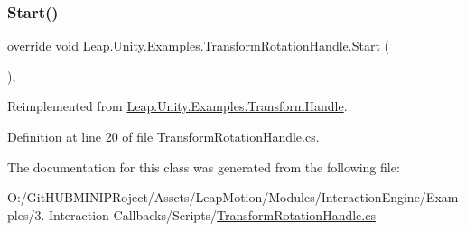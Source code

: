 \subsubsection{\texorpdfstring{Start()}{Start()}}
{\footnotesize\ttfamily override void Leap.\+Unity.\+Examples.\+Transform\+Rotation\+Handle.\+Start (\begin{DoxyParamCaption}{ }\end{DoxyParamCaption})\hspace{0.3cm}{\ttfamily [protected]}, {\ttfamily [virtual]}}



Reimplemented from \mbox{\hyperlink{class_leap_1_1_unity_1_1_examples_1_1_transform_handle_ab2c8be5053c981fff46ab6b5f99cac13}{Leap.\+Unity.\+Examples.\+Transform\+Handle}}.



Definition at line 20 of file Transform\+Rotation\+Handle.\+cs.



The documentation for this class was generated from the following file\+:\begin{DoxyCompactItemize}
\item 
O\+:/\+Git\+H\+U\+B\+M\+I\+N\+I\+P\+Roject/\+Assets/\+Leap\+Motion/\+Modules/\+Interaction\+Engine/\+Examples/3. Interaction Callbacks/\+Scripts/\mbox{\hyperlink{_transform_rotation_handle_8cs}{Transform\+Rotation\+Handle.\+cs}}\end{DoxyCompactItemize}
